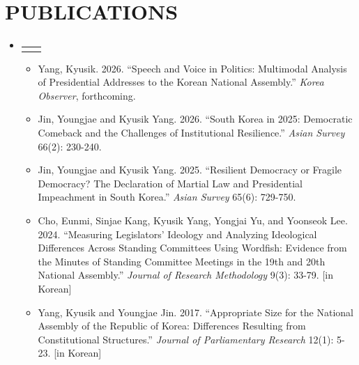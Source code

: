 \documentclass[a4paper,11pt]{article}
\makeatletter
\newcommand{\resumeItem}[1]{
  \item\small{
    {#1 \vspace{-2pt}}
  }
}
\newcommand{\resumeProjectHeading}[2]{
    \item
    \begin{tabular*}{1.001\textwidth}{l@{\extracolsep{\fill}}r}
      \small#1 & \textbf{\small #2}\\
    \end{tabular*}\vspace{-7pt}
}
\newcommand{\resumeSubHeadingListStart}{\begin{itemize}[leftmargin=0.0in, label={}]}
\newcommand{\resumeSubHeadingListEnd}{\end{itemize}}
\newcommand{\resumeItemListStart}{\begin{itemize}}
\newcommand{\resumeItemListEnd}{\end{itemize}\vspace{-5pt}}
\makeatother
\begin{document}
\section{PUBLICATIONS}
    \vspace{-4pt}
    \resumeSubHeadingListStart
      \resumeProjectHeading
          {}{}
        \vspace{-25pt}
          \resumeItemListStart
            \resumeItem{Yang, Kyusik. 2026. ``Speech and Voice in Politics: Multimodal Analysis of Presidential Addresses to the Korean National Assembly.'' \emph{Korea Observer}, forthcoming.}\\[0.7em]
            \resumeItem{Jin, Youngjae and Kyusik Yang. 2026. ``South Korea in 2025: Democratic Comeback and the Challenges of Institutional Resilience.'' \emph{Asian Survey} 66(2): 230-240.}\\[0.7em]
            \resumeItem{Jin, Youngjae and Kyusik Yang. 2025. ``Resilient Democracy or Fragile Democracy? The Declaration of Martial Law and Presidential Impeachment in South Korea.'' \emph{Asian Survey} 65(6): 729-750.}\\[0.7em]
            \resumeItem{Cho, Eunmi, Sinjae Kang, Kyusik Yang, Yongjai Yu, and Yoonseok Lee. 2024. ``Measuring Legislators' Ideology and Analyzing Ideological Differences Across Standing Committees Using Wordfish: Evidence from the Minutes of Standing Committee Meetings in the 19th and 20th National Assembly.'' \emph{Journal of Research Methodology} 9(3): 33-79. [in Korean]}\\[0.7em]
            \resumeItem{Yang, Kyusik and Youngjae Jin. 2017. ``Appropriate Size for the National Assembly of the Republic of Korea: Differences Resulting from Constitutional Structures.'' \emph{Journal of Parliamentary Research} 12(1): 5-23. \hspace{40pt} [in Korean]}
          \resumeItemListEnd
          \vspace{-10pt}

    \resumeSubHeadingListEnd
\vspace{0pt}
\end{document}
